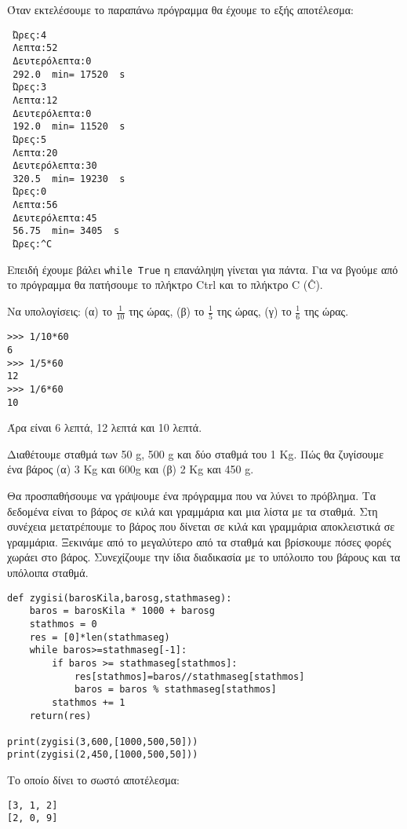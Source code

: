 Όταν εκτελέσουμε το παραπάνω πρόγραμμα θα έχουμε το εξής αποτέλεσμα:
\begin{lstlisting}
 Ώρες:4
 Λεπτα:52
 Δευτερόλεπτα:0
 292.0  min= 17520  s
 Ώρες:3
 Λεπτα:12
 Δευτερόλεπτα:0
 192.0  min= 11520  s
 Ώρες:5
 Λεπτα:20
 Δευτερόλεπτα:30
 320.5  min= 19230  s
 Ώρες:0
 Λεπτα:56
 Δευτερόλεπτα:45
 56.75  min= 3405  s
 Ώρες:^C
 \end{lstlisting}
Επειδή έχουμε βάλει \lstinline{while True} η επανάληψη γίνεται για πάντα. Για να βγούμε από το πρόγραμμα θα πατήσουμε το πλήκτρο Ctrl και το πλήκτρο C (\^C).
\begin{exercise}
Να υπολογίσεις: (α) το $\frac{1}{10}$ της ώρας, (β) το $\frac{1}{5}$ της ώρας, (γ) το $\frac{1}{6}$ της ώρας.
\end{exercise}
\begin{lstlisting}
>>> 1/10*60
6
>>> 1/5*60
12
>>> 1/6*60
10
\end{lstlisting}
Άρα είναι 6 λεπτά, 12 λεπτά και 10 λεπτά.

\begin{exercise}
Διαθέτουμε σταθμά των 50 g, 500 g και δύο σταθμά του 1 Κg. Πώς θα ζυγίσουμε
ένα βάρος (α) 3 Κg και 600g και (β) 2 Κg και 450 g.
\end{exercise}
Θα προσπαθήσουμε να γράψουμε ένα πρόγραμμα που να λύνει το πρόβλημα. Τα δεδομένα είναι το βάρος σε κιλά και γραμμάρια και μια λίστα με τα σταθμά. Στη συνέχεια μετατρέπουμε το βάρος που δίνεται σε κιλά και γραμμάρια αποκλειστικά σε γραμμάρια. Ξεκινάμε από το μεγαλύτερο από τα σταθμά και βρίσκουμε πόσες φορές χωράει στο βάρος. Συνεχίζουμε την ίδια διαδικασία με το υπόλοιπο του βάρους και τα υπόλοιπα σταθμά.
\begin{lstlisting}
def zygisi(barosKila,barosg,stathmaseg):
    baros = barosKila * 1000 + barosg
    stathmos = 0
    res = [0]*len(stathmaseg)
    while baros>=stathmaseg[-1]:
        if baros >= stathmaseg[stathmos]:
            res[stathmos]=baros//stathmaseg[stathmos]
            baros = baros % stathmaseg[stathmos]
        stathmos += 1
    return(res)

print(zygisi(3,600,[1000,500,50]))
print(zygisi(2,450,[1000,500,50]))
\end{lstlisting}
Το οποίο δίνει το σωστό αποτέλεσμα:
\begin{lstlisting}
[3, 1, 2]
[2, 0, 9]
\end{lstlisting}

